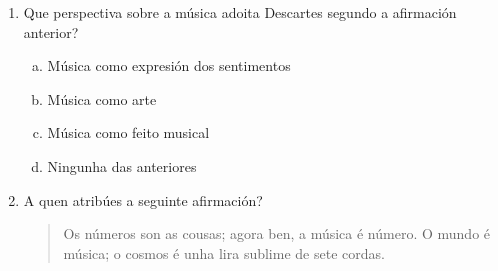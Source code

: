 \begin{ejercicio}
\begin{enumerate}[1)]
 \item 
 Que perspectiva sobre a música adoita Descartes segundo a afirmación anterior?
 \begin{enumerate}[a)]
  \item 
  Música como expresión dos sentimentos
  \item
  Música como arte
  \item %
  Música como feito musical
  \item
  Ningunha das anteriores
 \end{enumerate}
 \item 
 A quen atribúes a seguinte afirmación? \dotfill
     \begin{quote}
    {\small
    Os números son as cousas; agora ben, a música é número. O mundo é música; o cosmos é unha lira sublime de sete cordas.
    }
    \end{quote}
\end{enumerate}

\end{ejercicio}


